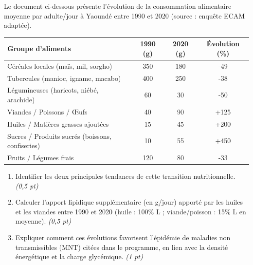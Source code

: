 \documentclass[11pt]{article}
\begin{document}
\begin{exercice}
Le document ci-dessous présente l'évolution de la consommation alimentaire moyenne par adulte/jour à Yaoundé entre 1990 et 2020 (source : enquête ECAM adaptée).
\begin{center}
\begin{tabular}{l c c c}
\hline
\textbf{Groupe d'aliments} & \textbf{1990 (g)} & \textbf{2020 (g)} & \textbf{Évolution (\%)} \\
\hline
Céréales locales (maïs, mil, sorgho) & 350 & 180 & -49 \\
Tubercules (manioc, igname, macabo) & 400 & 250 & -38 \\
Légumineuses (haricots, niébé, arachide) & 60 & 30 & -50 \\
Viandes / Poissons / Œufs & 40 & 90 & +125 \\
Huiles / Matières grasses ajoutées & 15 & 45 & +200 \\
Sucres / Produits sucrés (boissons, confiseries) & 10 & 55 & +450 \\
Fruits / Légumes frais & 120 & 80 & -33 \\
\hline
\end{tabular}
\end{center}
\begin{enumerate}
    \item Identifier les deux principales tendances de cette transition nutritionnelle. \textit{(0,5 pt)}
    \item Calculer l'apport lipidique supplémentaire (en g/jour) apporté par les huiles et les viandes entre 1990 et 2020 (huile : 100\% L ; viande/poisson : 15\% L en moyenne). \textit{(0,5 pt)}
    \item Expliquer comment ces évolutions favorisent l'épidémie de maladies non transmissibles (MNT) citées dans le programme, en lien avec la densité énergétique et la charge glycémique. \textit{(1 pt)}
\end{enumerate}
\end{exercice}
\end{document}
